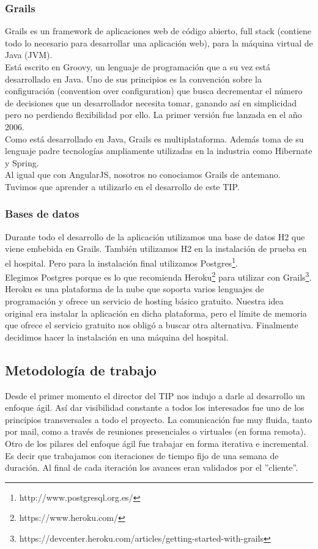 \subsubsection{Grails}
Grails es un framework de aplicaciones web de código abierto, full stack (contiene todo lo necesario para desarrollar una aplicación web), para la máquina virtual de Java (JVM).\\
Está escrito en Groovy, un lenguaje de programación que a su vez está desarrollado en Java. Uno de sus principios es la convención sobre la configuración (convention over configuration) que busca decrementar el número de decisiones que un desarrollador necesita tomar, ganando así en simplicidad pero no perdiendo flexibilidad por ello. La primer versión fue lanzada en el año 2006.\\
Como está desarrollado en Java, Grails es multiplataforma. Además toma de su lenguaje padre tecnologías ampliamente utilizadas en la industria como Hibernate y Spring.\\
Al igual que con AngularJS, nosotros no conociamos Grails de antemano. Tuvimos que aprender a utilizarlo en el desarrollo de este TIP.
\subsubsection{Bases de datos}
Durante todo el desarrollo de la aplicación utilizamos una base de datos H2 que viene embebida en Grails. También utilizamos H2 en la instalación de prueba en el hospital. Pero para la instalación final utilizamos Postgres\footnote{http://www.postgresql.org.es/}.\\
Elegimos Postgres porque es lo que recomienda Heroku\footnote{https://www.heroku.com/} para utilizar con Grails\footnote{https://devcenter.heroku.com/articles/getting-started-with-grails}. Heroku es una plataforma de la nube que soporta varios lenguajes de programación y ofrece un servicio de hosting básico gratuito. Nuestra idea original era instalar la aplicación en dicha plataforma, pero el límite de memoria que ofrece el servicio gratuito nos obligó a buscar otra alternativa. Finalmente decidimos hacer la instalación en una máquina del hospital.
\subsection{Metodología de trabajo}
Desde el primer momento el director del TIP nos indujo a darle al desarrollo un enfoque ágil\cite{Shore}. Así dar visibilidad constante a todos los interesados fue uno de los principios transversales a todo el proyecto. La comunicación fue muy fluida, tanto por mail, como a través de reuniones presenciales o virtuales (en forma remota). Otro de los pilares del enfoque ágil fue trabajar en forma iterativa e incremental. Es decir que trabajamos con iteraciones de tiempo fijo de una semana de duración. Al final de cada iteración los avances eran validados por el ''cliente''.

